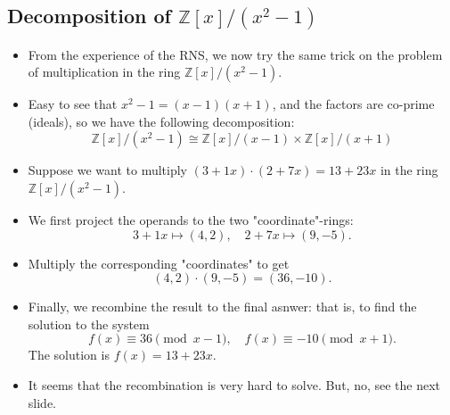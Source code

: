 \subsection{Decomposition of \( \mathbb{Z}[x]/(x^2-1) \)}
\begin{frame}
\begin{itemize}
    \item From the experience of the RNS, we now try the same trick on the problem of 
          multiplication in the ring \( \mathbb{Z}[x]/(x^2 - 1) \).
    \item Easy to see that \(x^2 - 1 = (x - 1)(x + 1)\), 
          and the factors are co-prime (ideals),
          so we have the following decomposition:
          \[ \mathbb{Z}[x]/(x^2 - 1) \cong 
             \mathbb{Z}[x]/(x - 1) \times 
             \mathbb{Z}[x]/(x + 1) \]
    \item Suppose we want to multiply \( (3 + 1x) \cdot (2 + 7x) = 13 + 23x\) in the ring 
          \( \mathbb{Z}[x]/(x^2 - 1) \).
    \item We first project the operands to the two "coordinate"-rings:
          \[
            3+1x \mapsto (4,2),\quad 2+7x \mapsto (9,-5).
          \]
    \item Multiply the corresponding "coordinates" to get
        \[
            (4,2)\cdot (9,-5) = (36,-10).
        \]
    \item Finally, we recombine the result to the final asnwer: 
          that is, to find the solution to the system
          \[
            f(x) \equiv 36 \pmod{x-1},\quad 
            f(x) \equiv -10 \pmod{x+1}.
          \]
          The solution is \(f(x) = 13 + 23 x\).
        \item It seems that the recombination is very hard to solve. But, no, see the next slide.
  \end{itemize}
\end{frame}

